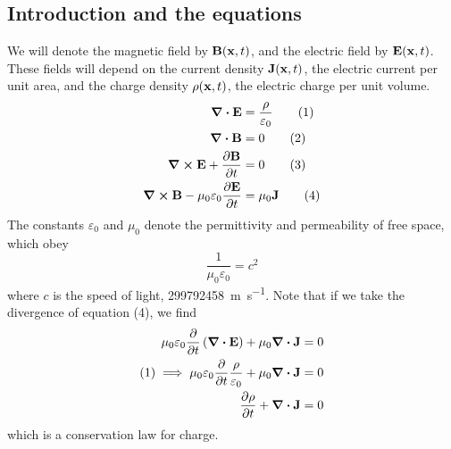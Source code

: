\subsection{Introduction and the equations}
We will denote the magnetic field by \(\vb B(\vb x, t)\), and the electric field by \(\vb E(\vb x, t)\).
These fields will depend on the current density \(\vb J(\vb x, t)\), the electric current per unit area, and the charge density \(\rho(\vb x, t)\), the electric charge per unit volume.
\begin{align}
	\div{\vb E}                                      & = \frac{\rho}{\varepsilon_0} \tag{1} \\
	\div{\vb B}                                      & = 0                          \tag{2} \\
	\curl{\vb E} + \pdv{\vb B}{t}                    & = 0                          \tag{3} \\
	\curl{\vb B} - \mu_0\varepsilon_0 \pdv{\vb E}{t} & = \mu_0 \vb J \tag{4}
\end{align}
The constants \(\varepsilon_0\) and \(\mu_0\) denote the permittivity and permeability of free space, which obey
\[
	\frac{1}{\mu_0 \varepsilon_0} = c^2
\]
where \(c\) is the speed of light, \SI{299792458}{\metre\per\second}.
Note that if we take the divergence of equation (4), we find
\begin{align*}
	\mu_0 \varepsilon_0 \pdv{t}\left( \div{\vb E} \right) + \mu_0 \div{\vb J}              & = 0 \\
	(1) \implies \mu_0 \varepsilon_0 \pdv{t}\frac{\rho}{\varepsilon_0} + \mu_0 \div{\vb J} & = 0 \\
	\pdv{\rho}{t} + \div{\vb J}                                                            & = 0 \\
\end{align*}
which is a conservation law for charge.


